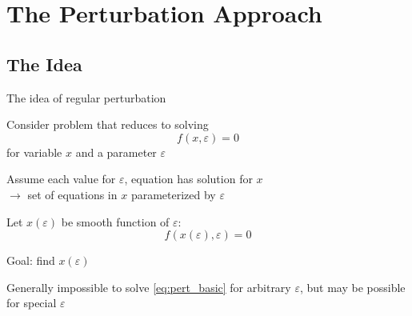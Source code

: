 \section{The Perturbation Approach}

\subsection{The Idea}
\renewcommand{\Source}{\textcite{Judd1998}, Ch. 13}
\begin{frame}{The idea of regular perturbation}
  \begin{witemize}
    \item Consider problem that reduces to solving
          \begin{equation}
            f\left( {x,\varepsilon } \right) = 0
          \end{equation}
          for variable $x$ and a parameter $\varepsilon$
    \item Assume each value for $\varepsilon$, equation has solution for $x$\\
          $\rightarrow$ set of equations in $x$ parameterized by $\varepsilon$
    \item Let $x(\varepsilon)$ be smooth function of $\varepsilon$:
          \begin{equation}
            f\left( {x\left( \varepsilon  \right),\varepsilon } \right) = 0 \label{eq:pert_basic}
          \end{equation}
    \item Goal: find $x\left( \varepsilon  \right)$
    \item Generally impossible to solve \eqref{eq:pert_basic} for arbitrary $\varepsilon$, but may be possible for special $\varepsilon$
  \end{witemize}
\end{frame}


